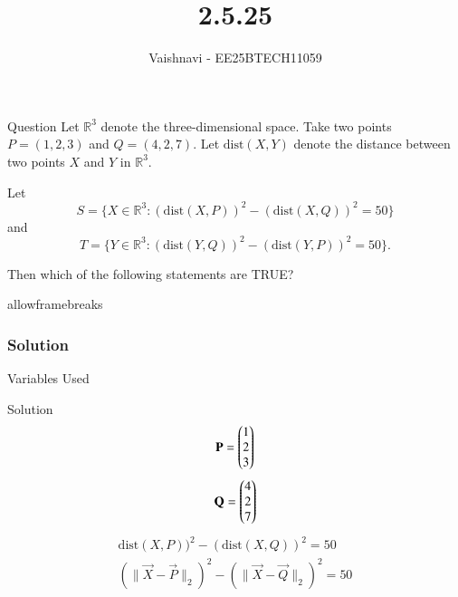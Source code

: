 \documentclass{beamer}
\title %
{2.5.25}
\author %
{Vaishnavi - EE25BTECH11059}
\begin{document}
\frame{\titlepage}
\begin{frame}{Question}
Let $\mathbb{R}^3$ denote the three-dimensional space. 
Take two points $P = (1,2,3)$ and $Q = (4,2,7)$. 
Let $\text{dist}(X,Y)$ denote the distance between two points $X$ and $Y$ in $\mathbb{R}^3$. 

Let
\[
S = \{X \in \mathbb{R}^3 : (\text{dist}(X,P))^2 - (\text{dist}(X,Q))^2 = 50 \}
\]
and
\[
T = \{Y \in \mathbb{R}^3 : (\text{dist}(Y,Q))^2 - (\text{dist}(Y,P))^2 = 50 \}.
\]

Then which of the following statements are TRUE? 
 

\end{frame}
\begin{frame}{allowframebreaks}
\frametitle{Solution}
\begin{table}[H]    
  \centering
  
  \caption{Variables Used}
  \label{tab:1.10.25}
\end{table}

\end{frame}


\begin{frame}{Solution}
\begin{align}
                                     \mathbf{P}= \begin{pmatrix}
                                             1
                                              \\
                                              2
                                               \\
                                               3
                                              \end{pmatrix}
\end{align}
\begin{align}
                                     \mathbf{Q}= \begin{pmatrix}
                                             4
                                              \\
                                              2
                                               \\
                                               7
                                              \end{pmatrix}
\end{align}
\begin{align}
 \text{dist}(X,P))^2 - (\text{dist}(X,Q))^2 = 50 \\
 (\|\vec{X}-\vec{P}\|_2)^2- (\|\vec{X}-\vec{Q}\|_2)^2=50
\end{align}

\end{frame}
\end{document}
